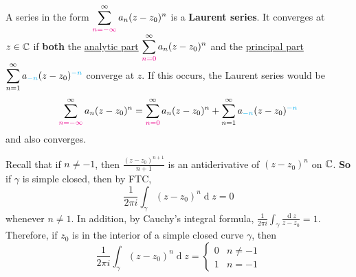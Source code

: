\documentclass[12pt]{article}
\renewcommand{\d}{\ensuremath{\operatorname{d}}}
\begin{document}
 A series in the form $\displaystyle \sum_{\textcolor{magenta}{n=-\infty}}^{\infty}a_n(z-z_0)^n$ is a \textbf{Laurent series}. It converges at $z\in \mathbb{C}$ if \textbf{both} the \uline{analytic part} \(\displaystyle \sum_{\textcolor{magenta}{n=0}}^{\infty}a_n(z-z_0)^n\) and the \uline{principal part} \(\displaystyle \sum_{n=1}^{\infty}a_{\textcolor{cyan}{-n}}(z-z_0)^{\textcolor{cyan}{-n}}\) converge at $z$. If this occurs, the Laurent series would be \[\sum_{\textcolor{magenta}{n=-\infty}}^{\infty}a_n(z-z_0)^n = \sum_{\textcolor{magenta}{n=0}}^{\infty}a_n(z-z_0)^n +\sum_{n=1}^{\infty}a_{\textcolor{cyan}{-n}}(z-z_0)^{\textcolor{cyan}{-n}}\] and also converges.

\lemma Recall that if $n\neq -1$, then $\frac{(z-z_0)^{n+1}}{n+1}$ is an antiderivative of $(z-z_0)^n$ on $\mathbb{C}$. \textbf{So} if $\gamma$ is simple closed, then by FTC, \[\frac{1}{2\pi i}\int_{\gamma}(z-z_0)^n\d z=0\] whenever $n\neq 1$. In addition, by Cauchy's integral formula, $\frac{1}{2\pi i}\int_{\gamma}\frac{\d z}{z-z_0}=1$. Therefore, if $z_0$ is in the interior of a simple closed curve $\gamma$, then \[\frac{1}{2\pi i}\int_{\gamma}(z-z_0)^n\d z= \begin{cases}
    0 & n\neq -1\\
    1 & n=-1
\end{cases}\]
\end{document}
